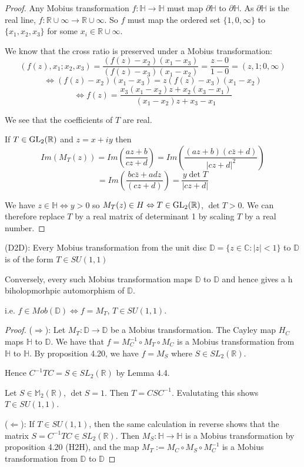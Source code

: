 \begin{proof}
	Any Mobius transformation $f: \mathbb{H} \rightarrow \mathbb{H}$ must map $\partial \mathbb{H}$ to $\partial \mathbb{H}$. As $\partial \mathbb{H}$ is the real line, $f: \mathbb{R} \cup \infty \rightarrow \mathbb{R} \cup \infty$. So $f$ must map the ordered set $\{1, 0, \infty \}$ to $\{x_1, x_2, x_3\}$ for some $x_i \in \mathbb{R} \cup \infty$.

	We know that the cross ratio is preserved under a Mobius transformation:
	\[(f(z), x_1; x_2, x_3) = \frac{(f(z) - x_2)(x_1 - x_3)}{(f(z) - x_3)(x_1 - x_2)} = \frac{z - 0}{1 - 0} = (z, 1; 0, \infty)\]
	\[\Leftrightarrow (f(z) - x_2)(x_1 - x_3) = z (f(z) - x_3)(x_1 - x_2)\]
	\[\Leftrightarrow f(z) = \frac{x_3 (x_1 - x_2) z + x_2 (x_3 - x_1)}{(x_1 - x_2)z + x_3 - x_1}\]

	We see that the coefficients of $T$ are real.
	
	If $T \in \text{GL}_2 (\mathbb{R})$ and $z = x + iy$ then
	\[Im(M_T(z)) = Im(\frac{az + b}{cz + d}) = Im(\frac{(az + b)(c \bar{z} + d)}{|cz + d|^2})\]
	\[= Im(\frac{bc \bar{z} + adz}{(cz + d)}) = \frac{y \det T}{|cz+d|}\]

	We have $z \in \mathbb{H} \Leftrightarrow y > 0$ so $M_T(z) \in H \Leftrightarrow T \in \text{GL}_2(\mathbb{R})$, $\det T > 0$. We can therefore replace $T$ by a real matrix of determinant 1 by scaling $T$ by a real number.
\end{proof}

\begin{proposition}
	(D2D): Every Mobius transformation from the unit disc $\mathbb{D} = \{z \in \mathbb{C}: |z| < 1\}$ to $\mathbb{D}$ is of the form $T \in SU(1, 1)$

	Conversely, every such Mobius transformation maps $\mathbb{D}$ to $\mathbb{D}$ and hence gives a h
	biholopmorhpic automorphism of $\mathbb{D}$.

	i.e. $f \in Mob(\mathbb{D}) \Leftrightarrow f = M_T$, $T \in SU(1, 1)$.
\end{proposition}

\begin{proof}
	($\Rightarrow$): Let $M_T: \mathbb{D} \rightarrow \mathbb{D}$ be a Mobius transformation. The Cayley map $H_C$ maps $\mathbb{H}$ to $\mathbb{D}$. We have that $f = M_C^{-1} \circ M_T \circ M_C$ is a Mobius transformation from $\mathbb{H}$ to $\mathbb{H}$. By proposition 4.20, we have $f = M_S$ where $S \in SL_2(\mathbb{R})$.

	Hence $C^{-1} T C = S \in SL_2(\mathbb{R})$ by Lemma 4.4.

	Let $S \in \mathbb{M}_2(\mathbb{R})$, $\det S = 1$. Then $T = CSC^{-1}$. Evalutating this shows $T \in SU(1, 1)$.

	($\Leftarrow$): If $T \in SU(1, 1)$, then the same calculation in reverse shows that the matrix $S = C^{-1} T C \in SL_2(\mathbb{R})$. Then $M_S: \mathbb{H} \rightarrow \mathbb{H}$ is a Mobius transformation by proposition 4.20 (H2H), and the map $M_T := M_C \circ M_S \circ M_C^{-1}$ is a Mobius transformation from $\mathbb{D}$ to $\mathbb{D}$
\end{proof}

